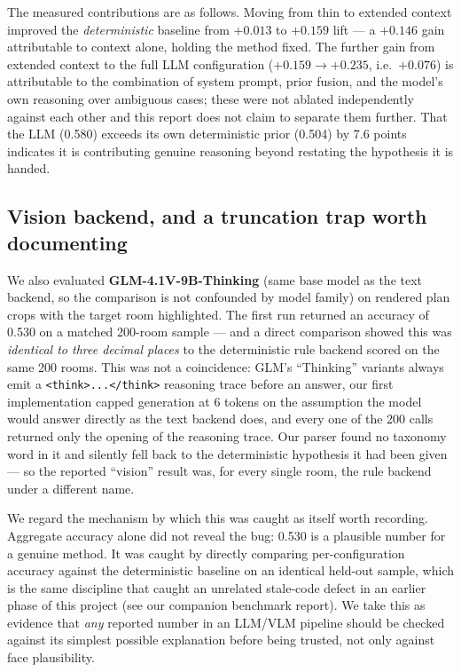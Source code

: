 \documentclass[11pt,a4paper]{article}
\begin{document}
The measured contributions are as follows. Moving from thin to extended
context improved the \emph{deterministic} baseline from $+0.013$ to $+0.159$
lift --- a $+0.146$ gain attributable to context alone, holding the method
fixed. The further gain from extended context to the full LLM configuration
($+0.159 \to +0.235$, i.e.\ $+0.076$) is attributable to the combination of
system prompt, prior fusion, and the model's own reasoning over ambiguous
cases; these were not ablated independently against each other and this
report does not claim to separate them further. That the LLM
(0.580) exceeds its own deterministic prior (0.504) by 7.6 points indicates it
is contributing genuine reasoning beyond restating the hypothesis it is
handed.

\subsection{Vision backend, and a truncation trap worth documenting}
\label{sec:vlm}

We also evaluated \textbf{GLM-4.1V-9B-Thinking} (same base model as the text
backend, so the comparison is not confounded by model family) on rendered
plan crops with the target room highlighted. The first run returned an
accuracy of 0.530 on a matched 200-room sample --- and a direct comparison
showed this was \emph{identical to three decimal places} to the deterministic
rule backend scored on the same 200 rooms. This was not a coincidence: GLM's
``Thinking'' variants always emit a \texttt{<think>...</think>} reasoning
trace before an answer, our first implementation capped generation at 6
tokens on the assumption the model would answer directly as the text backend
does, and every one of the 200 calls returned only the opening of the
reasoning trace. Our parser found no taxonomy word in it and silently fell
back to the deterministic hypothesis it had been given --- so the reported
``vision'' result was, for every single room, the rule backend under a
different name.

We regard the mechanism by which this was caught as itself worth recording.
Aggregate accuracy alone did not reveal the bug: 0.530 is a plausible number
for a genuine method. It was caught by directly comparing per-configuration
accuracy against the deterministic baseline on an identical held-out sample,
which is the same discipline that caught an unrelated stale-code defect in an
earlier phase of this project (see our companion benchmark report). We take
this as evidence that \emph{any} reported number in an LLM/VLM pipeline should
be checked against its simplest possible explanation before being trusted,
not only against face plausibility.
\end{document}
